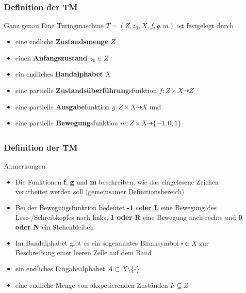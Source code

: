 \subsection*{}
\begin{frame}
  \frametitle{Definition der TM}

  \begin{block}{Ganz genau}
    Eine Turingmaschine $T = (Z, z_0, X, f, g, m)$ ist festgelegt durch
\begin{itemize}
	\item eine endliche \textbf{Zustandsmenge} $Z$
	\item einen \textbf{Anfangszustand} $z_0 \in Z$
	\item ein endliches \textbf{Bandalphabet} $X$
	\pause
	\item eine partielle \textbf{Zustandsüberführung}sfunktion $f : Z \times X \dashrightarrow  Z$
	\item eine partielle \textbf{Ausgabe}funktion $g : Z \times X \dashrightarrow  X$ und
	\item eine partielle \textbf{Bewegung}sfunktion $m : Z \times X \dashrightarrow  \{-1, 0, 1\}$\end{itemize}
\end{block}
\end{frame}

\subsection*{}
\begin{frame}
  \frametitle{Definition der TM}

  \begin{block}{Anmerkungen}
\begin{itemize}
	\item Die Funktionen \textbf{f}, \textbf{g} und \textbf{m} beschreiben, wie das eingelesene Zeichen verarbeitet werden soll (gemeinsamer Definitionsbereich)
		\pause
	\item Bei der Bewegungsfunktion bedeutet \textbf{-1 oder L} eine Bewegung des Lese-/Schreibkopfes nach links, \textbf{1 oder R}
eine Bewegung nach rechts und \textbf{0 oder N} ein Stehenbleiben\pause
  \item Im Bandalphabet gibt es ein sogenanntes Blanksymbol  $\square \in X$ zur Beschreibung einer leeren Zelle auf dem Band
  \item ein endliches Eingabealphabet $ A \subset X \setminus \{\square\}$
  \item eine endliche Menge von akzpetierenden Zuständen $F \subseteq Z$
\end{itemize}
\end{block}
\end{frame}

